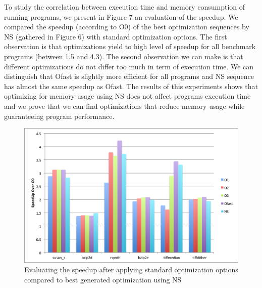 To study the correlation between execution time and memory consumption of running programs, we present in Figure 7 an evaluation of the speedup. We compared the speedup (according to O0) of the best optimization sequences by NS (gathered in Figure 6) with standard optimization options. 
The first observation is that optimizations yield to high level of speedup for all benchmark programs (between 1.5 and 4.3).
The second observation we can make is that different optimizations do not differ too much in term of execution time. We can distinguish that Ofast is slightly more efficient for all programs and NS sequence has almost the same speedup as Ofast. 
The results of this experiments shows that optimizing for memory usage using NS does not affect programs execution time and we prove that we can find optimizations that reduce memory usage while guaranteeing program performance.
\begin{figure}[!ht]
	\centering
	\includegraphics[width=1.\linewidth]{Ressources/infra_novelty_stat2.png}
	\caption{Evaluating the speedup after applying standard optimization options compared to best generated optimization using NS}
\end{figure}


